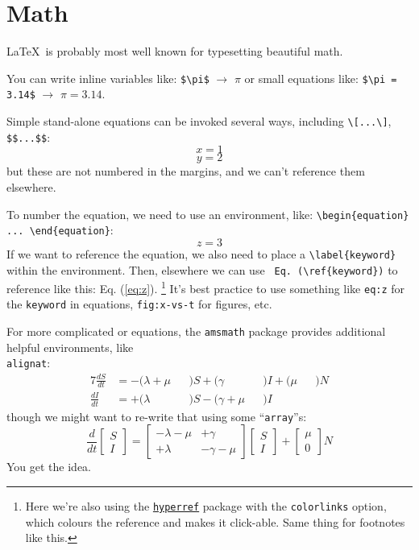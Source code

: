 \chapter{Math}
\LaTeX\ is probably most well known for typesetting beautiful math.
\par
You can write inline variables like: \lstinline|$\pi$| $\rightarrow$ $\pi$
or small equations like: \lstinline|$\pi = 3.14$| $\rightarrow$ $\pi = 3.14$.
\par
Simple stand-alone equations can be invoked several ways, including \lstinline|\[...\]|, \lstinline|$$...$$|:
\[ x = 1 \]
$$ y = 2 $$
but these are not numbered in the margins, and we can't reference them elsewhere.
\par
To number the equation, we need to use an environment, like: \lstinline|\begin{equation} ... \end{equation}|:
\begin{equation}
z = 3
\label{eq:z}
\end{equation}
If we want to reference the equation, we also need to place a \lstinline|\label{keyword}| within the environment.
Then, elsewhere we can use \lstinline| Eq. (\ref{keyword})| to reference like this: Eq. (\ref{eq:z}).%
\footnote{Here we're also using
  the \href{https://ctan.org/pkg/hyperref}{\texttt{hyperref}} package
  with the \lstinline|colorlinks| option,
  which colours the reference and makes it click-able.
  Same thing for footnotes like this.}
It's best practice to use something like \lstinline|eq:z| for the \lstinline|keyword| in equations, \lstinline|fig:x-vs-t| for figures, etc.
\par
For more complicated or equations, the \lstinline|amsmath| package provides additional helpful environments, like\\
\lstinline|alignat|:
\begin{alignat}{7}
\frac{dS}{dt} &= - (\lambda+\mu &&)S + (\gamma     &&)I + (\mu &&)N\\
\frac{dI}{dt} &= + (\lambda     &&)S - (\gamma+\mu &&)I
\end{alignat}
though we might want to re-write that using some ``\lstinline|array|''s:
\begin{equation}
\frac{d}{dt}
\left[ \begin{array}{c} S \\ I \end{array} \right] =
\left[ \begin{array}{cc} -\lambda-\mu & +\gamma \\ +\lambda & -\gamma-\mu \end{array} \right]
\left[ \begin{array}{c} S \\ I \end{array} \right] +
\left[ \begin{array}{c} \mu \\ 0 \end{array} \right] N
\end{equation}
You get the idea.
